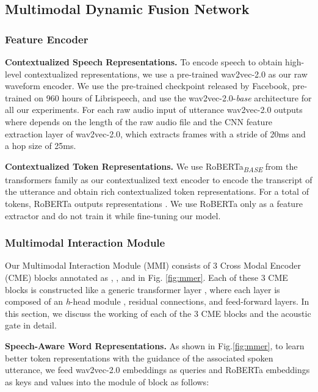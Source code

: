 \documentclass{INTERSPEECH2023}
\begin{document}
\subsection{Multimodal Dynamic Fusion Network}
\label{subsec:multimodal}

\subsubsection{Feature Encoder}

{\noindent \textbf{Contextualized Speech Representations.}} To encode speech to obtain high-level contextualized representations, we use a pre-trained wav2vec-2.0 \cite{baevski2020wav2vec} as our raw waveform encoder. We use the pre-trained checkpoint released by Facebook, pre-trained on 960 hours of Librispeech, and use the wav2vec-2.0-\emph{base} architecture for all our experiments. For each raw audio input  of utterance  wav2vec-2.0 outputs  where  depends on the length of the raw audio file and the CNN feature extraction layer of wav2vec-2.0, which extracts frames with a stride of 20ms and a hop size of 25ms.
\vspace{0.5mm}




{\noindent \textbf{Contextualized Token Representations.}} We use RoBERTa\textsubscript{\emph{BASE}} from the transformers family as our contextualized text encoder to encode the transcript of the utterance and obtain rich contextualized token representations. For a total of  tokens, RoBERTa outputs representations   . We use RoBERTa only as a feature extractor and do not train it while fine-tuning our model.






\subsubsection{Multimodal Interaction Module}
Our Multimodal Interaction Module (MMI) consists of 3 Cross Modal Encoder (CME) blocks annotated as , , and  in Fig. \ref{fig:mmer}. Each of these 3 CME blocks is constructed like a generic transformer layer \cite{vaswani2017attention}, where each layer is composed of an \emph{h}-head  module \cite{tsai2019multimodal}, residual connections, and feed-forward layers. In this section, we discuss the working of each of the 3 CME blocks and the acoustic gate  in detail.
\vspace{1mm}

{\noindent \textbf{Speech-Aware Word Representations.}} As shown in Fig.\ref{fig:mmer}, to learn better token representations with the guidance of the associated spoken utterance, we feed wav2vec-2.0 embeddings    as queries and RoBERTa embeddings    as keys and values into the  module of  block  as follows:
\end{document}
